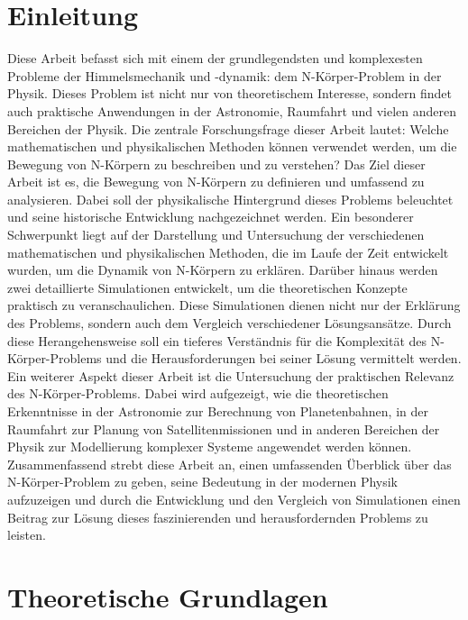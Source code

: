 \documentclass[a4paper,12pt,twoside]{article}
\begin{document}
\section{Einleitung}
Diese Arbeit befasst sich mit einem der grundlegendsten und komplexesten Probleme der Himmelsmechanik und -dynamik: dem N-Körper-Problem in der Physik. Dieses Problem ist nicht nur von theoretischem Interesse, sondern findet auch praktische Anwendungen in der Astronomie, Raumfahrt und vielen anderen Bereichen der Physik. Die zentrale Forschungsfrage dieser Arbeit lautet: Welche mathematischen und physikalischen Methoden können verwendet werden, um die Bewegung von N-Körpern zu beschreiben und zu verstehen? 
Das Ziel dieser Arbeit ist es, die Bewegung von N-Körpern zu definieren und umfassend zu analysieren. Dabei soll der physikalische Hintergrund dieses Problems beleuchtet und seine historische Entwicklung nachgezeichnet werden. Ein besonderer Schwerpunkt liegt auf der Darstellung und Untersuchung der verschiedenen mathematischen und physikalischen Methoden, die im Laufe der Zeit entwickelt wurden, um die Dynamik von N-Körpern zu erklären.
Darüber hinaus werden zwei detaillierte Simulationen entwickelt, um die theoretischen Konzepte praktisch zu veranschaulichen. Diese Simulationen dienen nicht nur der Erklärung des Problems, sondern auch dem Vergleich verschiedener Lösungsansätze. Durch diese Herangehensweise soll ein tieferes Verständnis für die Komplexität des N-Körper-Problems und die Herausforderungen bei seiner Lösung vermittelt werden.
Ein weiterer Aspekt dieser Arbeit ist die Untersuchung der praktischen Relevanz des N-Körper-Problems. Dabei wird aufgezeigt, wie die theoretischen Erkenntnisse in der Astronomie zur Berechnung von Planetenbahnen, in der Raumfahrt zur Planung von Satellitenmissionen und in anderen Bereichen der Physik zur Modellierung komplexer Systeme angewendet werden können.
Zusammenfassend strebt diese Arbeit an, einen umfassenden Überblick über das N-Körper-Problem zu geben, seine Bedeutung in der modernen Physik aufzuzeigen und durch die Entwicklung und den Vergleich von Simulationen einen Beitrag zur Lösung dieses faszinierenden und herausfordernden Problems zu leisten.

\newpage
\section{Theoretische Grundlagen}
\end{document}
